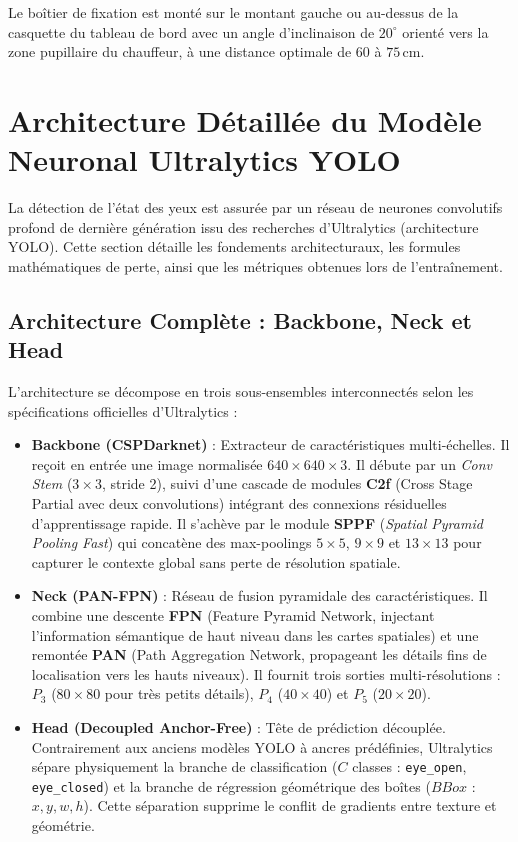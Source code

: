 \documentclass[11pt,a4paper]{article}
\begin{document}
Le boîtier de fixation est monté sur le montant gauche ou au-dessus de la casquette du tableau de bord avec un angle d'inclinaison de $20^\circ$ orienté vers la zone pupillaire du chauffeur, à une distance optimale de $60$ à $75\,\text{cm}$.

\section{Architecture Détaillée du Modèle Neuronal Ultralytics YOLO}

La détection de l'état des yeux est assurée par un réseau de neurones convolutifs profond de dernière génération issu des recherches d'Ultralytics (architecture YOLO). Cette section détaille les fondements architecturaux, les formules mathématiques de perte, ainsi que les métriques obtenues lors de l'entraînement.

\subsection{Architecture Complète : Backbone, Neck et Head}
L'architecture se décompose en trois sous-ensembles interconnectés selon les spécifications officielles d'Ultralytics :
\begin{itemize}
    \item \textbf{Backbone (CSPDarknet)} : Extracteur de caractéristiques multi-échelles. Il reçoit en entrée une image normalisée $640 \times 640 \times 3$. Il débute par un \emph{Conv Stem} ($3\times3$, stride 2), suivi d'une cascade de modules \textbf{C2f} (Cross Stage Partial avec deux convolutions) intégrant des connexions résiduelles d'apprentissage rapide. Il s'achève par le module \textbf{SPPF} (\emph{Spatial Pyramid Pooling Fast}) qui concatène des max-poolings $5\times5$, $9\times9$ et $13\times13$ pour capturer le contexte global sans perte de résolution spatiale.
    \item \textbf{Neck (PAN-FPN)} : Réseau de fusion pyramidale des caractéristiques. Il combine une descente \textbf{FPN} (Feature Pyramid Network, injectant l'information sémantique de haut niveau dans les cartes spatiales) et une remontée \textbf{PAN} (Path Aggregation Network, propageant les détails fins de localisation vers les hauts niveaux). Il fournit trois sorties multi-résolutions : $P_3$ ($80\times80$ pour très petits détails), $P_4$ ($40\times40$) et $P_5$ ($20\times20$).
    \item \textbf{Head (Decoupled Anchor-Free)} : Tête de prédiction découplée. Contrairement aux anciens modèles YOLO à ancres prédéfinies, Ultralytics sépare physiquement la branche de classification ($C$ classes : \texttt{eye\_open}, \texttt{eye\_closed}) et la branche de régression géométrique des boîtes ($BBox$ : $x, y, w, h$). Cette séparation supprime le conflit de gradients entre texture et géométrie.
\end{itemize}
\end{document}

